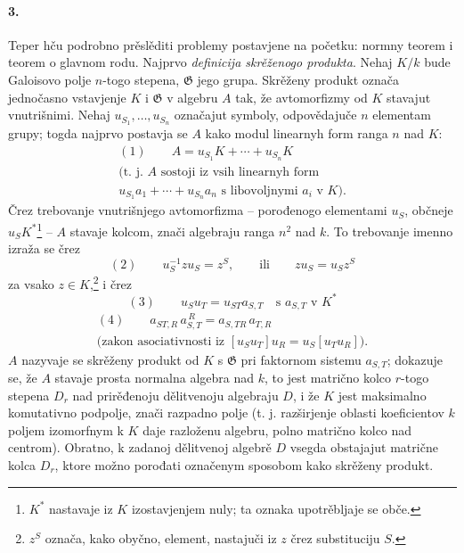 \documentclass[11pt]{article}
\begin{document}
\paragraph{3.}
Teper hču podrobno prěslěditi problemy postavjene na početku: normny teorem i teorem o glavnom rodu. Najprvo \emph{definicija skrěženogo produkta}. Nehaj \(K/k\) bude Galoisovo polje \(n\)-togo stepena, \(\mathfrak G\) jego grupa. Skrěženy produkt označa jednočasno vstavjenje \(K\) i \(\mathfrak G\) v algebru \(A\) tak, že avtomorfizmy od \(K\) stavajut vnutrišnimi. Nehaj \(u_{S_1},\ldots,u_{S_n}\) označajut symboly, odpovědajuče \(n\) elementam grupy; togda najprvo postavja se \(A\) kako modul linearnyh form ranga \(n\) nad \(K\):
\[
\begin{gathered}
(1)\qquad A=u_{S_1}K+\cdots+u_{S_n}K\\
\text{(t. j. \(A\) sostoji iz vsih linearnyh form}\\
\text{\(u_{S_1}a_1+\cdots+u_{S_n}a_n\) s libovoljnymi \(a_i\) v \(K\)).}
\end{gathered}
\]
Črez trebovanje vnutrišnjego avtomorfizma -- porođenogo elementami \(u_S\), občneje \(u_SK^\ast\)\footnote{\(K^\ast\) nastavaje iz \(K\) izostavjenjem nuly; ta oznaka upotrěbljaje se obče.} -- \(A\) stavaje kolcom, znači algebraju ranga \(n^2\) nad \(k\). To trebovanje imenno izraža se črez
\[
(2)\qquad u_S^{-1}zu_S=z^S,\qquad \text{ili}\qquad zu_S=u_Sz^S
\]
za vsako \(z\in K\),\footnote{\(z^S\) označa, kako obyčno, element, nastajuči iz \(z\) črez substituciju \(S\).} i črez
\[
(3)\qquad u_Su_T=u_{ST}a_{S,T}\quad \text{s }a_{S,T}\text{ v }K^\ast
\]
\[
\begin{gathered}
(4)\qquad a_{ST,R}\,a_{S,T}^{\,R}=a_{S,TR}\,a_{T,R}\\
\text{(zakon asociativnosti iz \([u_Su_T]u_R=u_S[u_Tu_R]\)).}
\end{gathered}
\]
\(A\) nazyvaje se skrěženy produkt od \(K\) s \(\mathfrak G\) pri faktornom sistemu \(a_{S,T}\); dokazuje se, že \(A\) stavaje prosta normalna algebra nad \(k\), to jest matrično kolco \(r\)-togo stepena \(D_r\) nad prirěđenoju dělitvenoju algebraju \(D\), i že \(K\) jest maksimalno komutativno podpolje, znači razpadno polje (t. j. razširjenje oblasti koeficientov \(k\) poljem izomorfnym k \(K\) daje razloženu algebru, polno matrično kolco nad centrom). Obratno, k zadanoj dělitvenoj algebrě \(D\) vsegda obstajajut matrične kolca \(D_r\), ktore možno porođati označenym sposobom kako skrěženy produkt.
\end{document}
